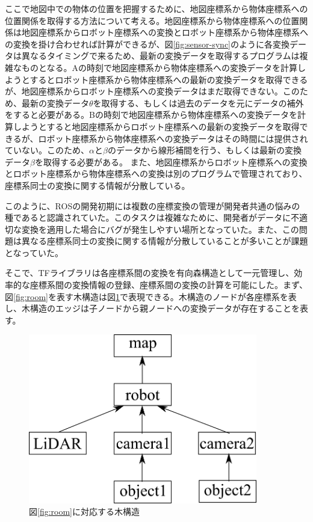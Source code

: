 \documentclass[a4paper]{jreport}	%
\begin{document}
ここで地図中での物体の位置を把握するために、地図座標系から物体座標系への位置関係を取得する方法について考える。地図座標系から物体座標系への位置関係は地図座標系からロボット座標系への変換とロボット座標系から物体座標系への変換を掛け合わせれば計算ができるが、図\ref{fig:sensor-sync}のように各変換データは異なるタイミングで来るため、最新の変換データを取得するプログラムは複雑なものとなる。Aの時刻で地図座標系から物体座標系への変換データを計算しようとするとロボット座標系から物体座標系への最新の変換データを取得できるが、地図座標系からロボット座標系への変換データはまだ取得できない。このため、最新の変換データ$\theta$を取得する、もしくは過去のデータを元にデータの補外をすると必要がある。Bの時刻で地図座標系から物体座標系への変換データを計算しようとすると地図座標系からロボット座標系への最新の変換データを取得できるが、ロボット座標系から物体座標系への変換データはその時間には提供されていない。このため、$\alpha$と$\beta$のデータから線形補間を行う、もしくは最新の変換データ$\beta$を取得する必要がある。
また、地図座標系からロボット座標系への変換とロボット座標系から物体座標系への変換は別のプログラムで管理されており、座標系同士の変換に関する情報が分散している。

このように、ROSの開発初期には複数の座標変換の管理が開発者共通の悩みの種であると認識されていた。このタスクは複雑なために、開発者がデータに不適切な変換を適用した場合にバグが発生しやすい場所となっていた。また、この問題は異なる座標系同士の変換に関する情報が分散していることが多いことが課題となっていた。

そこで、TFライブラリは各座標系間の変換を有向森構造として一元管理し、効率的な座標系間の変換情報の登録、座標系間の変換の計算を可能にした。まず、図\ref{fig:room}を表す木構造は図\ref{fig:room-tree}で表現できる。木構造のノードが各座標系を表し、木構造のエッジは子ノードから親ノードへの変換データが存在することを表す。

\begin{figure}[h] 
\centering
\includegraphics[width=10cm]{tree}	
\caption{図\ref{fig:room}に対応する木構造}
\label{fig:room-tree}
\end{figure}
\end{document}
